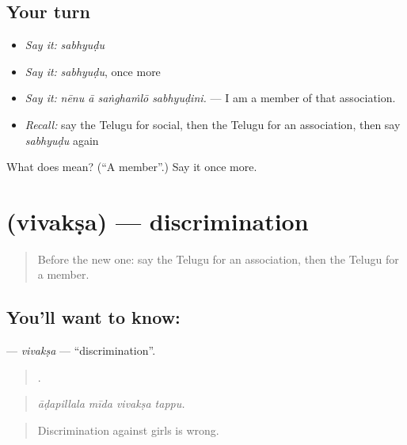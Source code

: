 \subsection*{Your turn}
\begin{itemize}
\raggedright
  \item \emph{Say it:} \emph{sabhyuḍu}
  \item \emph{Say it:} \emph{sabhyuḍu}, once more
  \item \emph{Say it:} \emph{nēnu ā saṅghaṁlō sabhyuḍini.} — I am a member of that association.
  \item \emph{Recall:} say the Telugu for social, then the Telugu for an association, then say \emph{sabhyuḍu} again
\end{itemize}

\begin{tcolorbox}[breakable,colback=teal!4,colframe=teal!35!black,title={Before you move on}]
What does  mean? (\textquotedblleft{}A member\textquotedblright{}.) Say it once more.
\end{tcolorbox}
\section[\texorpdfstring{\te{వివక్ష} (vivakṣa)}{వివక్ష (vivakṣa)}]{ (vivakṣa) — discrimination}

\label{lesson:TE-C408-vivaksa}



\begin{quote}
Before the new one: say the Telugu for an association, then the Telugu for a member.
\end{quote}

\subsection*{You'll want to know: }
\textbf{} — \emph{vivakṣa} — \textquotedblleft{}discrimination\textquotedblright{}.

\begin{quote}
   .
\end{quote}

\begin{quote}
\emph{āḍapillala mīda vivakṣa tappu.}
\end{quote}

\begin{quote}
Discrimination against girls is wrong.
\end{quote}

